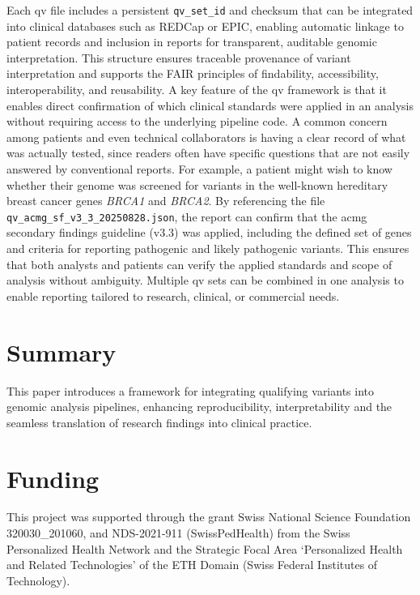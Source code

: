 Each \ac{qv} file includes a persistent \texttt{qv\_set\_id} and checksum that can be integrated into clinical databases such as REDCap or EPIC, enabling automatic linkage to patient records and inclusion in reports for transparent, auditable genomic interpretation. This structure ensures traceable provenance of variant interpretation and supports the FAIR principles of findability, accessibility, interoperability, and reusability.
A key feature of the \ac{qv} framework is that it enables direct confirmation of which clinical standards were applied in an analysis without requiring access to the underlying pipeline code. A common concern among patients and even technical collaborators is having a clear record of what was actually tested, since readers often have specific questions that are not easily answered by conventional reports. For example, a patient might wish to know whether their genome was screened for variants in the well-known hereditary breast cancer genes \textit{BRCA1} and \textit{BRCA2}. By referencing the file \texttt{qv\_acmg\_sf\_v3\_3\_20250828.json}, the report can confirm that the \ac{acmg} secondary findings guideline (v3.3) \cite{miller2023acmg} was applied, including the defined set of genes and criteria for reporting pathogenic and likely pathogenic variants. This ensures that both analysts and patients can verify the applied standards and scope of analysis without ambiguity. Multiple \ac{qv} sets can be combined in one analysis to enable reporting tailored to research, clinical, or commercial needs.

\FloatBarrier

\section{Summary}
This paper introduces a framework for integrating qualifying variants into genomic analysis pipelines, enhancing reproducibility, interpretability and the seamless translation of research findings into clinical practice.

\section{Funding}
This project was supported through the grant Swiss National Science Foundation  320030\_201060, and NDS-2021-911 (SwissPedHealth) from the Swiss Personalized Health Network and the Strategic Focal Area `Personalized Health and Related Technologies' of the ETH Domain (Swiss Federal Institutes of Technology).

